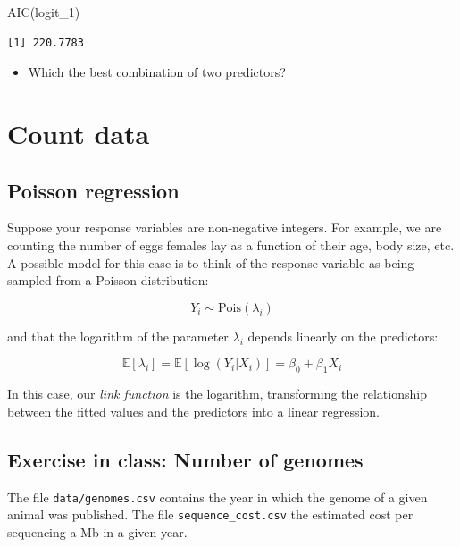 \documentclass[
  letterpaper,
  DIV=11,
  numbers=noendperiod]{scrreprt}
\newenvironment{Shaded}{\begin{snugshade}}{\end{snugshade}}
\newcommand{\FunctionTok}[1]{\textcolor[rgb]{0.28,0.35,0.67}{#1}}
\newcommand{\NormalTok}[1]{\textcolor[rgb]{0.00,0.23,0.31}{#1}}
\providecommand{\tightlist}{%
  \setlength{\itemsep}{0pt}\setlength{\parskip}{0pt}}\usepackage{longtable,booktabs,array}
\begin{document}
\begin{Shaded}
\begin{Highlighting}[]
\FunctionTok{AIC}\NormalTok{(logit\_1)}
\end{Highlighting}
\end{Shaded}

\begin{verbatim}
[1] 220.7783
\end{verbatim}

\begin{itemize}
\tightlist
\item
  Which the best combination of two predictors?
\end{itemize}

\hypertarget{count-data}{%
\section{Count data}\label{count-data}}

\hypertarget{poisson-regression}{%
\subsection{Poisson regression}\label{poisson-regression}}

Suppose your response variables are non-negative integers. For example,
we are counting the number of eggs females lay as a function of their
age, body size, etc. A possible model for this case is to think of the
response variable as being sampled from a Poisson distribution:

\[
Y_i \sim \text{Pois}(\lambda_i)
\]

and that the logarithm of the parameter \(\lambda_i\) depends linearly
on the predictors:

\[
\mathbb E[\lambda_i] = \mathbb E[\log(Y_i|X_i)] = \beta_0 + \beta_1 X_i
\]

In this case, our \emph{link function} is the logarithm, transforming
the relationship between the fitted values and the predictors into a
linear regression.

\hypertarget{exercise-in-class-number-of-genomes}{%
\subsection{Exercise in class: Number of
genomes}\label{exercise-in-class-number-of-genomes}}

The file \texttt{data/genomes.csv} contains the year in which the genome
of a given animal was published. The file \texttt{sequence\_cost.csv}
the estimated cost per sequencing a Mb in a given year.
\end{document}

